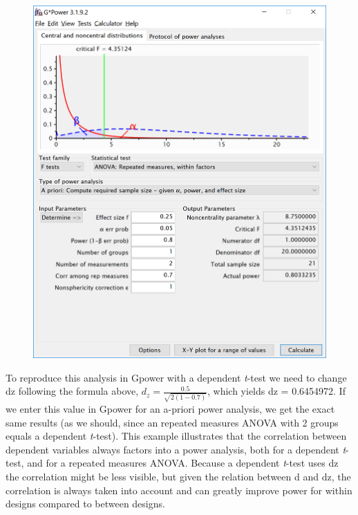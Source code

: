 \documentclass[]{article}
\begin{document}
\begin{figure}
\centering
\includegraphics{screenshots/gpower_11.png}
\caption{}
\end{figure}

To reproduce this analysis in Gpower with a dependent \emph{t}-test we
need to change dz following the formula above,
\(d_{z}=\frac{0.5}{\sqrt{2(1-0.7)}}\), which yields dz = 0.6454972. If
we enter this value in Gpower for an a-priori power analysis, we get the
exact same results (as we should, since an repeated measures ANOVA with
2 groups equals a dependent \emph{t}-test). This example illustrates
that the correlation between dependent variables always factors into a
power analysis, both for a dependent \emph{t}-test, and for a repeated
measures ANOVA. Because a dependent \emph{t}-test uses dz the
correlation might be less visible, but given the relation between d and
dz, the correlation is always taken into account and can greatly improve
power for within designs compared to between designs.
\end{document}

